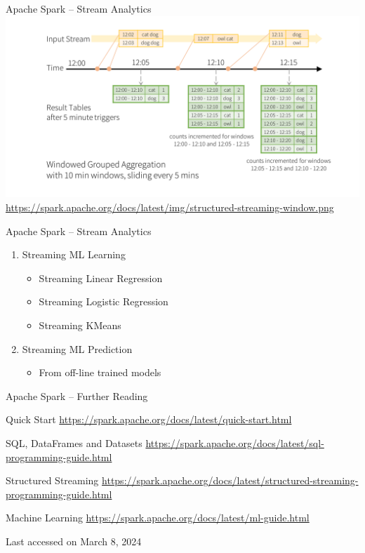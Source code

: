 \documentclass[ignorenonframetext,xcolor=x11names]{beamer}
\begin{document}
\begin{frame}{Apache Spark -- Stream Analytics}
\includegraphics[width=\textwidth]{structured-streaming-window.png} \\

\scriptsize\url{https://spark.apache.org/docs/latest/img/structured-streaming-window.png}
\end{frame}


\begin{frame}{Apache Spark -- Stream Analytics}
\begin{enumerate}
   \item Streaming ML Learning
   \begin{itemize}
       \item Streaming Linear Regression
       \item Streaming Logistic Regression
       \item Streaming KMeans
   \end{itemize}
   \item Streaming ML Prediction
   \begin{itemize}
       \item From off-line trained models
   \end{itemize}
\end{enumerate}
\end{frame}

\begin{frame}{Apache Spark -- Further Reading}
\begin{block}{Quick Start}
\footnotesize
\url{https://spark.apache.org/docs/latest/quick-start.html}\normalsize
\end{block}

\begin{block}{SQL, DataFrames and Datasets}
\footnotesize
\url{https://spark.apache.org/docs/latest/sql-programming-guide.html}\normalsize
\end{block}

\begin{block}{Structured Streaming}
\footnotesize
\url{https://spark.apache.org/docs/latest/structured-streaming-programming-guide.html}\normalsize
\end{block}

\begin{block}{Machine Learning}
\footnotesize
\url{https://spark.apache.org/docs/latest/ml-guide.html}\normalsize
\end{block}

\scriptsize Last accessed on March 8, 2024
\end{frame}
\end{document}
